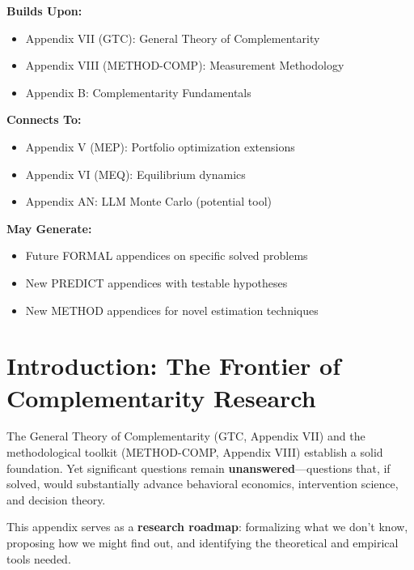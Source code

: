 \begin{tcolorbox}[colback=gray!5!white,colframe=gray!75!black,title=\textbf{Cross-Reference Map}]
\small
\textbf{Builds Upon:}
\begin{itemize}[noitemsep]
    \item Appendix VII (GTC): General Theory of Complementarity
    \item Appendix VIII (METHOD-COMP): Measurement Methodology
    \item Appendix B: Complementarity Fundamentals
\end{itemize}

\textbf{Connects To:}
\begin{itemize}[noitemsep]
    \item Appendix V (MEP): Portfolio optimization extensions
    \item Appendix VI (MEQ): Equilibrium dynamics
    \item Appendix AN: LLM Monte Carlo (potential tool)
\end{itemize}

\textbf{May Generate:}
\begin{itemize}[noitemsep]
    \item Future FORMAL appendices on specific solved problems
    \item New PREDICT appendices with testable hypotheses
    \item New METHOD appendices for novel estimation techniques
\end{itemize}
\end{tcolorbox}

\section{Introduction: The Frontier of Complementarity Research}
\label{sec:research-intro}

\begin{tcolorbox}[colback=blue!5!white,colframe=blue!75!black,title=\textbf{Fundamental Motivation}]
The General Theory of Complementarity (GTC, Appendix VII) and the methodological toolkit (METHOD-COMP, Appendix VIII) establish a solid foundation. Yet significant questions remain \textbf{unanswered}---questions that, if solved, would substantially advance behavioral economics, intervention science, and decision theory.

This appendix serves as a \textbf{research roadmap}: formalizing what we don't know, proposing how we might find out, and identifying the theoretical and empirical tools needed.
\end{tcolorbox}

